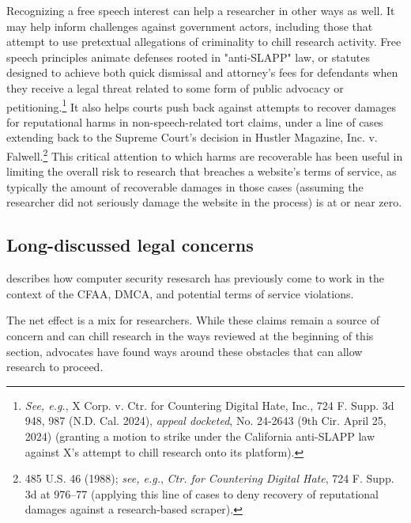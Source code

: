Recognizing a free speech interest can help a researcher in other ways as well. It may help inform challenges against government actors, including those that attempt to use pretextual allegations of criminality to chill research activity. Free speech principles animate defenses rooted in "anti-SLAPP" law, or statutes designed to achieve both quick dismissal and attorney's fees for defendants when they receive a legal threat related to some form of public advocacy or petitioning.\footnote{\textit{See, e.g.}, X Corp. v. Ctr. for Countering Digital Hate, Inc., 724 F. Supp. 3d 948, 987 (N.D. Cal. 2024), \textit{appeal docketed}, No. 24-2643 (9th Cir. April 25, 2024) (granting a motion to strike under the California anti-SLAPP law against X's attempt to chill research onto its platform).} It also helps courts push back against attempts to recover damages for reputational harms in non-speech-related tort claims, under a line of cases extending back to the Supreme Court's decision in Hustler Magazine, Inc. v. Falwell.\footnote{485 U.S. 46 (1988); \textit{see, e.g.}, \textit{Ctr. for Countering Digital Hate}, 724 F. Supp. 3d at 976–77 (applying this line of cases to deny recovery of reputational damages against a research-based scraper).} This critical attention to which harms are recoverable has been useful in limiting the overall risk to research that breaches a website's terms of service, as typically the amount of recoverable damages in those cases (assuming the researcher did not seriously damage the website in the process) is at or near zero.

\subsection{Long-discussed legal concerns}
 describes how computer security resesarch has previously come to work in the context of the CFAA, DMCA, and potential terms of service violations. 

The net effect is a mix for researchers. While these claims remain a source of concern and can chill research in the ways reviewed at the beginning of this section, advocates have found ways around these obstacles that can allow research to proceed.

